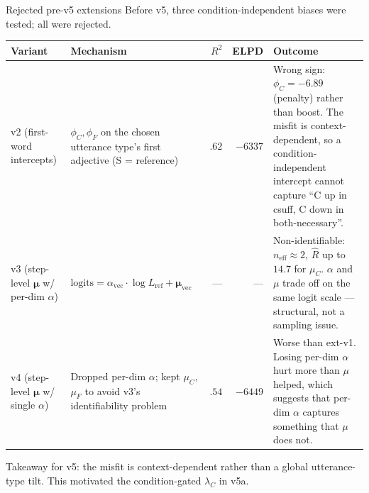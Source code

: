 \documentclass[10pt,aspectratio=169]{beamer}
\newcommand{\muted}[1]{\textcolor{CSP-text-light}{#1}}
\begin{document}
\begin{frame}{Rejected pre-v5 extensions}
\footnotesize
Before v5, three condition-independent biases were tested; all were rejected.

\vspace{0.6em}
\begin{center}
\renewcommand{\arraystretch}{1.3}
\begin{tabular}{p{2.0cm} p{4.6cm} rr p{5.0cm}}
\toprule
Variant & Mechanism & $R^2$ & ELPD & Outcome \\
\midrule
v2 \muted{(first-word intercepts)} &
$\phi_C, \phi_F$ on the chosen utterance type's first adjective (S = reference) &
$.62$ & $-6337$ &
Wrong sign: $\phi_C = -6.89$ (penalty) rather than boost. The misfit is context-dependent, so a condition-independent intercept cannot capture ``C up in csuff, C down in both-necessary''. \\
\midrule
v3 \muted{(step-level $\bm{\mu}$ w/ per-dim $\alpha$)} &
$\text{logits} = \alpha_\text{vec} \cdot \log L_\text{ref} + \bm{\mu}_\text{vec}$ &
--- & --- &
Non-identifiable: $n_\text{eff} \approx 2$, $\hat R$ up to $14.7$ for $\mu_C$. $\alpha$ and $\mu$ trade off on the same logit scale --- structural, not a sampling issue. \\
\midrule
v4 \muted{(step-level $\bm{\mu}$ w/ single $\alpha$)} &
Dropped per-dim $\alpha$; kept $\mu_C$, $\mu_F$ to avoid v3's identifiability problem &
$.54$ & $-6449$ &
Worse than ext-v1. Losing per-dim $\alpha$ hurt more than $\mu$ helped, which suggests that per-dim $\alpha$ captures something that $\mu$ does not. \\
\bottomrule
\end{tabular}
\end{center}

\vspace{0.5em}
Takeaway for v5: the misfit is context-dependent rather than a global utterance-type tilt. This motivated the condition-gated $\lambda_C$ in v5a.
\end{frame}
\end{document}
